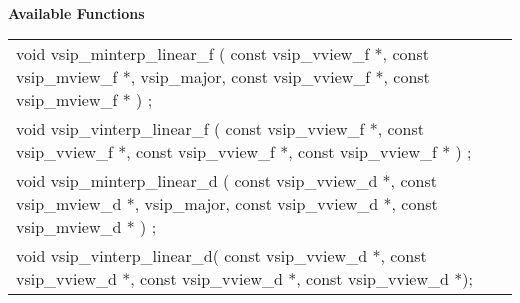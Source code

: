 \\\cvsiplh
\newline \hspace*{.8cm} \vspace*{.1cm} \textbf{Available Functions }
\newline \hspace*{1.1cm} {
\ttfamily
\begin{tabular}[H]{l}
void vsip\_minterp\_linear\_f ( const vsip\_vview\_f *, const vsip\_mview\_f *, vsip\_major, const vsip\_vview\_f *, const vsip\_mview\_f * ) ;\\
void vsip\_vinterp\_linear\_f ( const vsip\_vview\_f *, const vsip\_vview\_f *, const vsip\_vview\_f *, const vsip\_vview\_f * ) ;\\
void vsip\_minterp\_linear\_d ( const vsip\_vview\_d *, const vsip\_mview\_d *, vsip\_major, const vsip\_vview\_d *, const vsip\_mview\_d * ) ;\\
void vsip\_vinterp\_linear\_d( const vsip\_vview\_d *, const vsip\_vview\_d *, const vsip\_vview\_d *, const vsip\_vview\_d *);\\
\end{tabular}
}\\
\\\pyjvsiph
{}
